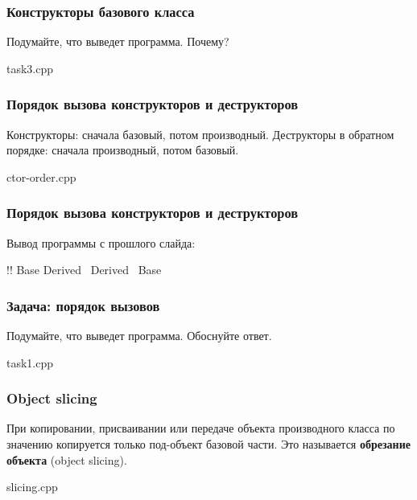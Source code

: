 \documentclass[compress, 8pt, aspectratio=169]{beamer}
\begin{document}
  \begin{frame}[fragile]

    \frametitle{Конструкторы базового класса}

    \begin{task}
      Подумайте, что выведет программа. Почему?
    \end{task}

        {task3.cpp}

  \end{frame}

  \begin{frame}[fragile]

    \frametitle{Порядок вызова конструкторов и деструкторов}

    Конструкторы: сначала базовый, потом производный. Деструкторы
    \textemdash \space в обратном порядке: сначала производный,
    потом базовый.

        {ctor-order.cpp}

  \end{frame}

  \begin{frame}[fragile]

    \frametitle{Порядок вызова конструкторов и деструкторов}

    Вывод программы с прошлого слайда:

    \begin{terminalwindow}
!!
Base
Derived
~Derived
~Base
    \end{terminalwindow}

  \end{frame}

  \begin{frame}[fragile]

    \frametitle{Задача: порядок вызовов}

    \begin{task}
      Подумайте, что выведет программа. Обоснуйте ответ.
    \end{task}

        {task1.cpp}

  \end{frame}

  \begin{frame}[fragile]

    \frametitle{Object slicing}

    При копировании, присваивании или передаче объекта производного
    класса по значению копируется только под-объект базовой части.
    Это называется \textbf{обрезание объекта} (object slicing).

        {slicing.cpp}

  \end{frame}
\end{document}
